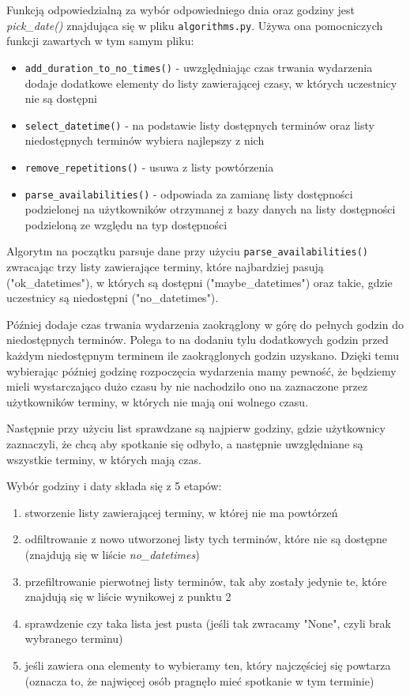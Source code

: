 \documentclass[11pt,a4paper]{article}
\newcommand{\classname}[1]{\texttt{#1}}
\begin{document}
Funkcją odpowiedzialną za wybór odpowiedniego dnia oraz godziny jest \textit{pick\_date()} znajdująca się w pliku \texttt{algorithms.py}. Używa ona pomocniczych funkcji zawartych w tym samym pliku:
\begin{itemize}
    \item \classname{add\_duration\_to\_no\_times()} - uwzględniając czas trwania wydarzenia dodaje dodatkowe elementy do listy zawierającej czasy, w których uczestnicy nie są dostępni
    \item \classname{select\_datetime()} - na podstawie listy dostępnych terminów oraz listy niedostępnych terminów wybiera najlepszy z nich
    \item \classname{remove\_repetitions()} - usuwa z listy powtórzenia
    \item \classname{parse\_availabilities()} - odpowiada za zamianę listy dostępności podzielonej na użytkowników otrzymanej z bazy danych na listy dostępności podzieloną ze względu na typ dostępności
\end{itemize}

Algorytm na początku parsuje dane przy użyciu \classname{parse\_availabilities()} zwracając trzy listy zawierające terminy, które najbardziej pasują ("ok\_datetimes"), w których są dostępni ("maybe\_datetimes") oraz takie, gdzie uczestnicy są niedostępni ("no\_datetimes"). 

Później dodaje czas trwania wydarzenia zaokrąglony w górę do pełnych godzin do niedostępnych terminów. Polega to na dodaniu tylu dodatkowych godzin przed każdym niedostępnym terminem ile zaokrąglonych godzin uzyskano. Dzięki temu wybierając później godzinę rozpoczęcia wydarzenia mamy pewność, że będziemy mieli wystarczająco dużo czasu by nie nachodziło ono na zaznaczone przez użytkowników terminy, w których nie mają oni wolnego czasu.

Następnie przy użyciu list sprawdzane są najpierw godziny, gdzie użytkownicy zaznaczyli, że chcą aby spotkanie się odbyło, a następnie uwzględniane są wszystkie terminy, w których mają czas.

Wybór godziny i daty składa się z 5 etapów:

\begin{enumerate}
    \item stworzenie listy zawierającej terminy, w której nie ma powtórzeń
    \item odfiltrowanie z nowo utworzonej listy tych terminów, które nie są dostępne (znajdują się w liście \textit{no\_datetimes})
    \item przefiltrowanie pierwotnej listy terminów, tak aby zostały jedynie te, które znajdują się w liście wynikowej z punktu 2
    \item sprawdzenie czy taka lista jest pusta (jeśli tak zwracamy "None", czyli brak wybranego terminu)
    \item jeśli zawiera ona elementy to wybieramy ten, który najczęściej się powtarza (oznacza to, że najwięcej osób pragnęło mieć spotkanie w tym terminie)
\end{enumerate}
\end{document}
